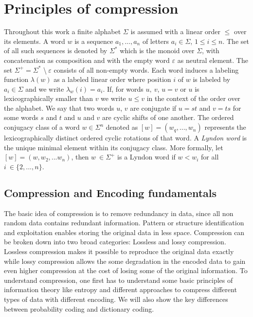 
\chapter{Principles of compression}
\label{ch:Principles of compression}
\par{
Throughout this work a finite alphabet $\Sigma$ is assumed with a linear order $\leq$ over its elements. A word $w$ is a sequence $a_1,...,a_n$ of letters $a_i \in \Sigma$, $1 \leq i \leq n$. The set of all such sequences is denoted by $\Sigma^*$ which is the monoid over $\Sigma$, with concatenation as composition and with the empty word $\varepsilon$ as neutral element. The set $\Sigma^+ = \Sigma^*$ \textbackslash $\: \varepsilon$ consists of all non-empty words. Each word induces a labeling function $\lambda(w)$ as a labeled linear order where position $i$ of $w$ is labeled by $a_i \in \Sigma$ and we write $\lambda_w (i) = a_i$. If, for words $u, \: v$, $u = v$ or $u$ is lexicographically smaller than $v$ we write $u \leq v$ in the context of the order over the alphabet. We say that two words $u$, $v$ are conjugate if $u = st$ and $v = ts$ for some words $s$ and $t$ and $u$ and $v$ are cyclic shifts of one another. The ordered conjugacy class of a word $w \in \Sigma^n$ denoted as $[w] = (w_q,...,w_n)$ represents the lexicographically distinct ordered cyclic rotations of that word. A \emph{Lyndon word} is the unique minimal element within its conjugacy class. More formally, let $[w] = (w,w_2,...w_n)$, then $w \: \in \Sigma^+$ is a Lyndon word if $w<w_i$ for all $i \: \in \{2,...,n\}$.
}

\section{Compression and Encoding fundamentals}
\label{ch:Principles of compression:sec:Compression}
\par{
	The basic idea of compression is to remove redundancy in data, since all non random data contains redundant information. Pattern or structure identification and exploitation enables storing the original data in less space. Compression can be broken down into two broad categories: Lossless and lossy compression. Lossless compression makes it possible to reproduce the original data exactly while lossy compression allows the some degradation in the encoded data to gain even higher compression at the cost of losing some of the original information. To understand compression, one first has to understand some basic principles of information theory like entropy and different approaches to compress different types of data with different encoding. We will also show the key differences between probability coding and dictionary coding.}


